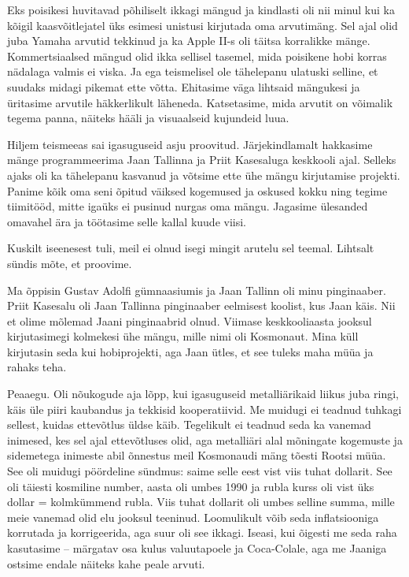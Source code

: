 
Eks poisikesi huvitavad põhiliselt ikkagi mängud ja kindlasti oli nii minul  
kui ka kõigil kaasvõitlejatel üks esimesi unistusi 
kirjutada oma arvutimäng. Sel ajal olid juba  
Yamaha arvutid tekkinud ja ka Apple II-s oli täitsa 
korralikke mänge. Kommertsiaalsed mängud olid ikka sellisel 
tasemel, mida poisikene hobi korras nädalaga valmis ei viska. Ja 
ega teismelisel ole tähelepanu ulatuski 
selline, et suudaks midagi pikemat ette võtta. Ehitasime väga 
lihtsaid mängukesi ja üritasime arvutile 
häkkerlikult läheneda. Katsetasime, mida arvutit on 
võimalik tegema panna, näiteks hääli ja visuaalseid kujundeid luua. 

Hiljem teismeeas sai igasuguseid asju proovitud. Järjekindlamalt 
hakkasime mänge programmeerima Jaan Tallinna ja Priit 
Kasesaluga keskkooli ajal. Selleks ajaks oli 
ka tähelepanu 
kasvanud ja võtsime ette ühe mängu kirjutamise projekti. Panime kõik oma seni 
õpitud väiksed kogemused 
ja oskused kokku ning tegime tiimitööd, mitte igaüks ei pusinud nurgas oma 
mängu. Jagasime 
ülesanded omavahel ära ja töötasime selle kallal kuude viisi. 


Kuskilt iseenesest tuli, meil ei olnud isegi
mingit arutelu sel teemal. Lihtsalt sündis mõte, et proovime. 


Ma õppisin Gustav Adolfi gümnaasiumis
ja Jaan Tallinn oli minu pinginaaber. Priit 
Kasesalu oli Jaan Tallinna pinginaaber eelmisest 
koolist, kus Jaan käis. Nii et olime mõlemad Jaani pinginaabrid olnud. Viimase 
keskkooliaasta jooksul kirjutasimegi kolmekesi ühe mängu, 
mille nimi oli Kosmonaut. Mina küll  
kirjutasin seda kui hobiprojekti, aga Jaan ütles, et see tuleks maha müüa ja 
rahaks teha. 


Peaaegu. Oli nõukogude aja lõpp, kui igasuguseid 
metalliärikaid liikus juba ringi, käis üle piiri  
kaubandus ja tekkisid kooperatiivid. Me 
muidugi ei teadnud tuhkagi sellest, kuidas ettevõtlus 
üldse käib. Tegelikult ei teadnud seda ka vanemad inimesed, kes sel 
ajal ettevõtluses olid, aga metalliäri alal 
mõningate kogemuste ja 
sidemetega inimeste abil õnnestus meil Kosmonaudi mäng tõesti Rootsi müüa. 
See oli muidugi pöördeline sündmus: saime selle eest 
vist viis tuhat 
dollarit. See oli täiesti kosmiline number, aasta oli umbes 1990 ja rubla 
kurss oli vist üks dollar = kolmkümmend rubla. Viis tuhat dollarit 
oli umbes selline summa, mille meie vanemad olid elu jooksul teeninud. 
Loomulikult võib seda inflatsiooniga korrutada ja 
korrigeerida, aga suur oli see ikkagi. Iseasi, kui õigesti me seda raha 
kasutasime – märgatav osa kulus 
valuutapoele ja Coca-Colale, aga me Jaaniga ostsime endale näiteks kahe 
peale arvuti. 

